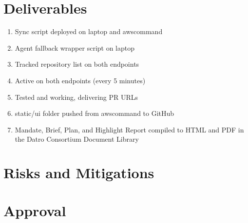 \documentclass[letterpaper,10pt,openany,oneside,english]{sphinxmanual}
\begin{document}
\section{Deliverables}
\label{\detokenize{deliverables:deliverables}}\label{\detokenize{deliverables::doc}}\begin{enumerate}
%
\item {} 
\sphinxAtStartPar
{} \textendash{} Sync script deployed on laptop and aws\sphinxhyphen{}command

\item {} 
\sphinxAtStartPar
{} \textendash{} Agent fallback wrapper script on laptop

\item {} 
\sphinxAtStartPar
{} \textendash{} Tracked repository list on both endpoints

\item {} 
\sphinxAtStartPar
{} \textendash{} Active on both endpoints (every 5 minutes)

\item {} 
\sphinxAtStartPar
{} \textendash{} Tested and working, delivering PR URLs

\item {} 
\sphinxAtStartPar
{} \textendash{} static/ui folder pushed from aws\sphinxhyphen{}command to GitHub

\item {} 
\sphinxAtStartPar
{} \textendash{} Mandate, Brief, Plan, and Highlight Report
compiled to HTML and PDF in the Datro Consortium Document Library

\end{enumerate}

\sphinxstepscope


\section{Risks and Mitigations}
\label{\detokenize{risks:risks-and-mitigations}}\label{\detokenize{risks::doc}}
\sphinxstepscope


\section{Approval}
\label{\detokenize{approval:approval}}\label{\detokenize{approval::doc}}
\end{document}
